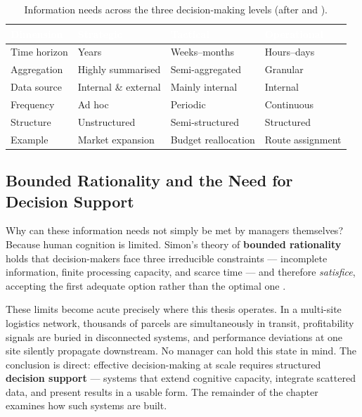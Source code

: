 \begin{table}[H]
\centering
\caption{Information needs across the three decision-making levels
(after \textcite{anthony1965} and \textcite{gorry1971}).}
\label{tab:ch1-info-needs}
\renewcommand{\arraystretch}{1.35}
\begin{tabularx}{\linewidth}{|>{\raggedright\arraybackslash}p{3cm}|>{\raggedright\arraybackslash}X|>{\raggedright\arraybackslash}X|>{\raggedright\arraybackslash}X|}
\hline
\rowcolor{tblheader}
\textcolor{white}{\textbf{Dimension}} &
\textcolor{white}{\textbf{Strategic}} &
\textcolor{white}{\textbf{Tactical}} &
\textcolor{white}{\textbf{Operational}} \\
\hline
Time horizon & Years & Weeks--months & Hours--days \\
Aggregation  & Highly summarised & Semi-aggregated & Granular \\
Data source  & Internal \& external & Mainly internal & Internal \\
Frequency    & Ad hoc & Periodic & Continuous \\
Structure    & Unstructured & Semi-structured & Structured \\
Example      & Market expansion & Budget reallocation & Route assignment \\
\hline
\end{tabularx}
\end{table}

\subsection{Bounded Rationality and the Need for Decision Support}

Why can these information needs not simply be met by managers themselves? Because human cognition is
limited. Simon's theory of \textbf{bounded rationality} holds that decision-makers face three
irreducible constraints --- incomplete information, finite processing capacity, and scarce time --- and
therefore \emph{satisfice}, accepting the first adequate option rather than the optimal one
\parencite{simon1957}.

These limits become acute precisely where this thesis operates. In a multi-site logistics network,
thousands of parcels are simultaneously in transit, profitability signals are buried in disconnected
systems, and performance deviations at one site silently propagate downstream. No manager can hold this
state in mind. The conclusion is direct: effective decision-making at scale requires structured
\textbf{decision support} --- systems that extend cognitive capacity, integrate scattered data, and
present results in a usable form. The remainder of the chapter examines how such systems are built.

